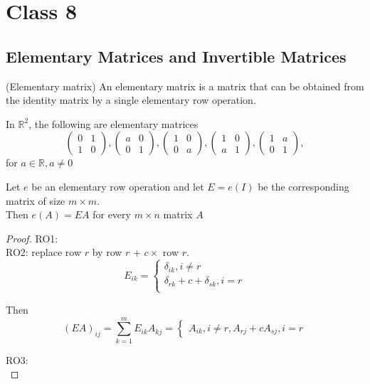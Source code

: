 \section{Class 8}

\subsection{Elementary Matrices and Invertible Matrices}

\begin{definition}
    (Elementary matrix) An elementary matrix is a matrix that can be obtained from the identity matrix by a single elementary row operation.
\end{definition}

\begin{example}
    In $\mathbb{R}^2$, the following are elementary matrices 
    \[
    \begin{pmatrix} 0 & 1 \\ 1 & 0  \end{pmatrix} ,
    \begin{pmatrix} a & 0 \\ 0 & 1  \end{pmatrix} ,
    \begin{pmatrix} 1 & 0 \\ 0 & a  \end{pmatrix} ,
    \begin{pmatrix} 1 & 0 \\ a & 1  \end{pmatrix} ,
    \begin{pmatrix} 1 & a \\ 0 & 1  \end{pmatrix} ,
    \]
    for $a \in \mathbb{R}, a \neq 0$
\end{example}

\begin{theorem}
    Let $e$ be an elementary row operation and let $E = e(I)$ be the corresponding matrix of size $m \times m$. \\
    
    Then $e(A) = EA$ for every $m \times n$ matrix $A$
\end{theorem}

\begin{proof}
RO1: \\

RO2: replace row $r$ by row $r$ + $c \times $ row $r$. 
\[
    E_{ik} = \begin{cases}
        \delta_{ik}, i \neq r \\
        \delta_{rk} + c + \delta_{sk}, i = r \\
    \end{cases}
\]

Then 
\[
    (EA)_{ij} = \sum\limits_{k = 1}^{m} E_{ik}A_{kj} = \begin{cases}
        A_{ik},  i \neq r , 
        A_{rj } + cA_{sj}, i = r
    \end{cases}
\]

RO3:  \\
\end{proof}

